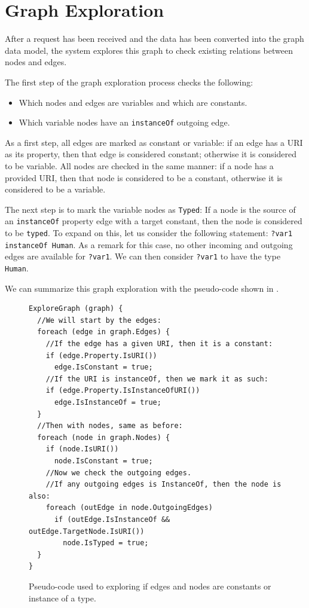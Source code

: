 
\section{Graph Exploration}
\label{chap:graph_exploration}

After a request has been received and the data has been converted into the graph data model, the system explores this graph to check existing relations between nodes and edges. 

The first step of the graph exploration process checks the following:
\begin{itemize}
    \item Which nodes and edges are variables and which are constants.
    \item Which variable nodes have an \texttt{instanceOf} outgoing edge.
\end{itemize}

As a first step, all edges are marked as constant or variable: 
if an edge has a URI as its property, then that edge is considered constant; otherwise it is considered to be variable. 
All nodes are checked in the same manner: if a node has a provided URI, then that node is considered to be a constant, otherwise it is considered to be a variable. 

The next step is to mark the variable nodes as \texttt{Typed}:
If a node is the source of an \texttt{instanceOf} property edge with a target constant, then the node is considered to be \texttt{typed}. To expand on this, let us consider the following statement: \texttt{?var1 instanceOf Human}. As a remark for this case, no other incoming and outgoing edges are available for \texttt{?var1}. We can then consider \texttt{?var1} to have the type \texttt{Human}.

We can summarize this graph exploration with the pseudo-code shown in .
\begin{figure}[H]
\begin{verbatim}
ExploreGraph (graph) {
  //We will start by the edges:
  foreach (edge in graph.Edges) {
    //If the edge has a given URI, then it is a constant:
    if (edge.Property.IsURI())
      edge.IsConstant = true;
    //If the URI is instanceOf, then we mark it as such:
    if (edge.Property.IsInstanceOfURI())
      edge.IsInstanceOf = true;
  }
  //Then with nodes, same as before:
  foreach (node in graph.Nodes) {
    if (node.IsURI())
      node.IsConstant = true;
    //Now we check the outgoing edges.
    //If any outgoing edges is InstanceOf, then the node is also:
    foreach (outEdge in node.OutgoingEdges)
      if (outEdge.IsInstanceOf && outEdge.TargetNode.IsURI())
        node.IsTyped = true;
  }
}
\end{verbatim}
\caption{Pseudo-code used to exploring if edges and nodes are constants or instance of a type.}
\label{fig:codeExploration}
\end{figure}

